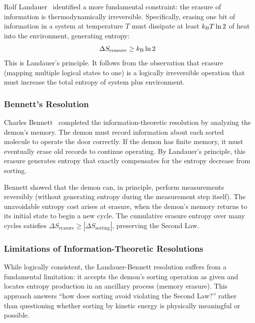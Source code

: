 Rolf Landauer~\cite{landauer1961irreversibility} identified a more fundamental constraint: the erasure of information is thermodynamically irreversible. Specifically, erasing one bit of information in a system at temperature $T$ must dissipate at least $k_{\mathrm{B}} T \ln 2$ of heat into the environment, generating entropy:
\begin{equation}
\Delta S_{\text{erasure}} \geq k_{\mathrm{B}} \ln 2
\label{eq:landauer}
\end{equation}
This is Landauer's principle. It follows from the observation that erasure (mapping multiple logical states to one) is a logically irreversible operation that must increase the total entropy of system plus environment.

\subsubsection{Bennett's Resolution}

Charles Bennett~\cite{bennett1982thermodynamics} completed the information-theoretic resolution by analyzing the demon's memory. The demon must record information about each sorted molecule to operate the door correctly. If the demon has finite memory, it must eventually erase old records to continue operating. By Landauer's principle, this erasure generates entropy that exactly compensates for the entropy decrease from sorting.

Bennett showed that the demon can, in principle, perform measurements reversibly (without generating entropy during the measurement step itself). The unavoidable entropy cost arises at erasure, when the demon's memory returns to its initial state to begin a new cycle. The cumulative erasure entropy over many cycles satisfies $\Delta S_{\text{erasure}} \geq |\Delta S_{\text{sorting}}|$, preserving the Second Law.

\subsubsection{Limitations of Information-Theoretic Resolutions}

While logically consistent, the Landauer-Bennett resolution suffers from a fundamental limitation: it accepts the demon's sorting operation as given and locates entropy production in an ancillary process (memory erasure). This approach answers ``how does sorting avoid violating the Second Law?'' rather than questioning whether sorting by kinetic energy is physically meaningful or possible.

